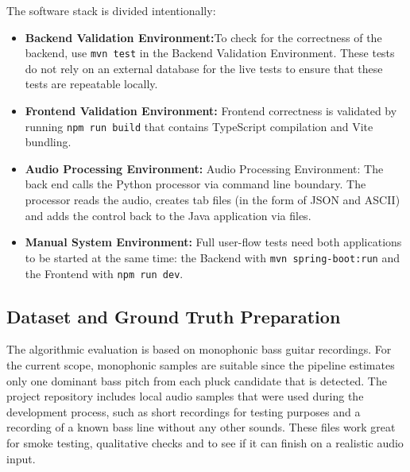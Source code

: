 \documentclass[a4paper, 12pt, titlepage]{article}
\begin{document}
The software stack is divided intentionally:
\begin{itemize}
    \item \textbf{Backend Validation Environment:}To  check for the correctness of the backend, use \texttt{mvn test} in the Backend Validation Environment. These tests do not rely on an external database for the live tests to ensure that these tests are repeatable locally.
    \item \textbf{Frontend Validation Environment:}  Frontend correctness is validated by running \texttt{npm run build} that contains TypeScript compilation and Vite bundling.
    \item \textbf{Audio Processing Environment:}     Audio Processing Environment: The back end calls the Python processor via command line boundary. The processor reads the audio, creates tab files (in the form of JSON and ASCII) and adds the control back to the Java application via files.
    \item \textbf{Manual System Environment:} Full user-flow tests need both applications to be started at the same time: the Backend with \texttt{mvn spring-boot:run} and the Frontend with \texttt{npm run dev}.
\end{itemize}

\subsection{Dataset and Ground Truth Preparation}

The algorithmic evaluation is based on monophonic bass guitar recordings. For the current scope, monophonic samples are suitable since the pipeline estimates only one dominant bass pitch from each pluck candidate that is detected. The project repository includes local audio samples that were used during the development process, such as short recordings for testing purposes and a recording of a known bass line without any other sounds. These files work great for smoke testing, qualitative checks and to see if it can finish on a realistic audio input.
\end{document}
